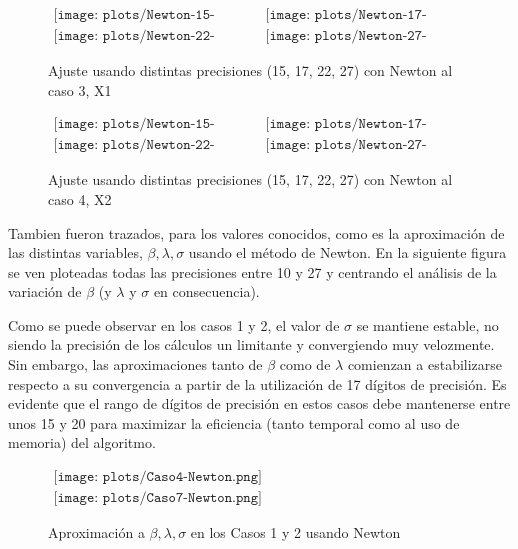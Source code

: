 \begin{figure} [H]
$\begin{array}{cc}
\texttt{[image: plots/Newton-15-caso3.png]} &
\texttt{[image: plots/Newton-17-caso3.png]} \\
\texttt{[image: plots/Newton-22-caso3.png]} &
\texttt{[image: plots/Newton-27-caso3.png]}
\end{array}$
\caption{Ajuste usando distintas precisiones (15, 17, 22, 27) con Newton al caso 3, X1}
\label{fig:FitCaso3Newton}
\end{figure}

\begin{figure} [H]
$\begin{array}{cc}
\texttt{[image: plots/Newton-15-caso4.png]} &
\texttt{[image: plots/Newton-17-caso4.png]} \\
\texttt{[image: plots/Newton-22-caso4.png]} &
\texttt{[image: plots/Newton-27-caso4.png]}
\end{array}$
\caption{Ajuste usando distintas precisiones (15, 17, 22, 27) con Newton al caso 4, X2}
\label{fig:FitCaso4Newton}
\end{figure}


Tambien fueron trazados, para los valores conocidos, como es la 
aproximaci\'on de las distintas variables, $\beta, \lambda, \sigma$ usando el 
m\'etodo de Newton. En la siguiente figura se ven ploteadas todas las 
precisiones entre 10 y 27 y centrando el an\'alisis de la variaci\'on de 
$\beta$ (y $\lambda$ y $\sigma$ en consecuencia).

Como se puede observar en los casos 1 y 2, el valor de $\sigma$ se mantiene 
estable, no siendo la precisi\'on de los c\'alculos un limitante y convergiendo 
muy velozmente. Sin embargo, las aproximaciones tanto de $\beta$ como de 
$\lambda$ comienzan a estabilizarse respecto a su convergencia a partir de la 
utilizaci\'on de 17 d\'igitos de precisi\'on. Es evidente que el rango de 
d\'igitos de precisi\'on en estos casos debe mantenerse entre unos 15 y 20 
para maximizar la eficiencia (tanto temporal como al uso de memoria) del 
algoritmo.  

\begin{figure}
$\begin{array}{c}
\texttt{[image: plots/Caso4-Newton.png]} \\
\texttt{[image: plots/Caso7-Newton.png]}
\end{array}$

\caption{Aproximaci\'on a $\beta, \lambda, \sigma$ en los Casos 1 y 2 
usando Newton}
\end{figure}

